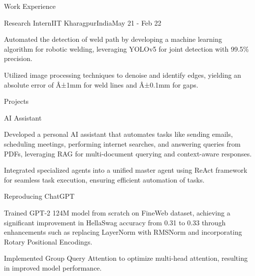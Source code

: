 \documentclass{resume}
\begin{document}
\begin{rSection}{Work Experience}
\begin{rSubsectionWork}{Research Intern}{IIT Kharagpur}{India}{May 21 - Feb 22}

\vspace{-3pt}
\item Automated the detection of weld path by developing a machine learning algorithm for robotic welding, leveraging YOLOv5 for joint detection with 99.5\% precision.
\vspace{-3pt}
\item Utilized image processing techniques to denoise and identify edges, yielding an absolute error of Â±1mm for weld lines and Â±0.1mm for gaps.
\end{rSubsectionWork}
\end{rSection}
\begin{rSection}{Projects}
\vspace{-3pt}

    \begin{rSubsectionProj}{AI Assistant}

    \vspace{-3pt}
\item Developed a personal AI assistant that automates tasks like sending emails, scheduling meetings, performing internet searches, and answering queries from PDFs, leveraging RAG for multi-document querying and context-aware responses.
\vspace{-3pt}
\item Integrated specialized agents into a unified master agent using ReAct framework for seamless task execution, ensuring efficient automation of tasks.
\end{rSubsectionProj}
\vspace{-3pt}

    \begin{rSubsectionProj}{Reproducing ChatGPT}

    \vspace{-3pt}
\item Trained GPT-2 124M model from scratch on FineWeb dataset, achieving a significant improvement in HellaSwag accuracy from 0.31 to 0.33 through enhancements such as replacing LayerNorm with RMSNorm and incorporating Rotary Positional Encodings.
\vspace{-3pt}
\item Implemented Group Query Attention to optimize multi-head attention, resulting in improved model performance.
\end{rSubsectionProj}
\vspace{-3pt}


\end{rSection}
\end{document}
